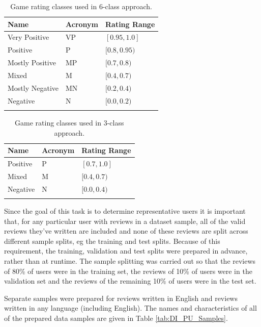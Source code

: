 \begin{table}[ht]
    \centering
    \begin{tabular}{l l l}
        \toprule
        \textbf{Name} & \textbf{Acronym} & \textbf{Rating Range}\\\midrule
        Very Positive & VP & $[0.95, 1.0]$\\
        Positive & P & $[0.8, 0.95)$\\
        Mostly Positive & MP & $[0.7, 0.8)$\\
        Mixed & M & $[0.4, 0.7)$\\
        Mostly Negative & MN & $[0.2, 0.4)$\\
        Negative & N & $[0.0, 0.2)$\\
        \bottomrule\\
    \end{tabular}
    \caption{Game rating classes used in 6-class approach.}
    \label{tab:DI_PU_Classes6}
\end{table}

\begin{table}[ht]
    \centering
    \begin{tabular}{l l l}
        \toprule
        \textbf{Name} & \textbf{Acronym} & \textbf{Rating Range}\\\midrule
        Positive & P & $[0.7, 1.0]$\\
        Mixed & M & $[0.4, 0.7)$\\
        Negative & N & $[0.0, 0.4)$\\
        \bottomrule\\
    \end{tabular}
    \caption{Game rating classes used in 3-class approach.}
    \label{tab:DI_PU_Classes3}
\end{table}

Since the goal of this task is to determine representative users it is important that, for any particular user with reviews in a dataset sample, all of the valid reviews they've written are included and none of these reviews are split across different sample splits, eg the training and test splits. Because of this requirement, the training, validation and test splits were prepared in advance, rather than at runtime. The sample splitting was carried out so that the reviews of 80\% of users were in the training set, the reviews of 10\% of users were in the validation set and the reviews of the remaining 10\% of users were in the test set.

Separate samples were prepared for reviews written in English and reviews written in any language (including English). The names and characteristics of all of the prepared data samples are given in Table \ref{tab:DI_PU_Samples}.

